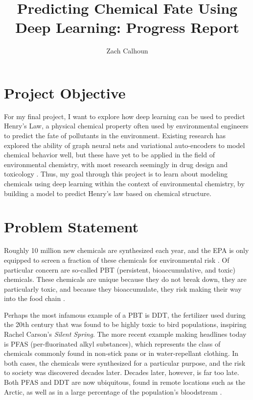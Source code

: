 \documentclass[12pt, oneside]{article}   	%
\title{Predicting Chemical Fate Using Deep Learning: Progress Report}
\author{Zach Calhoun}
\begin{document}
\maketitle
\section{Project Objective}
For my final project, I want to explore how deep learning can be used to predict Henry's Law, a physical chemical property often used by environmental engineers to predict the fate of pollutants in the environment. Existing research has explored the ability of graph neural nets and variational auto-encoders to model chemical behavior well, but these have yet to be applied in the field of environmental chemistry, with most research seemingly in drug design and toxicology \cite{RN106}. Thus, my goal through this project is to learn about modeling chemicals using deep learning within the context of environmental chemistry, by building a model to predict Henry's law based on chemical structure.

\section{Problem Statement}
Roughly 10 million new chemicals are synthesized each year, and the EPA is only equipped to screen a fraction of these chemicals for environmental risk \cite{burton}. Of particular concern are so-called PBT (persistent, bioaccumulative, and toxic) chemicals. These chemicals are unique because they do not break down, they are particularly toxic, and because they bioaccumulate, they risk making their way into the food chain \cite{matthies}.

Perhaps the most infamous example of a PBT is DDT, the fertilizer used during the 20th century that was found to be highly toxic to bird populations, inspiring Rachel Carson's \emph{Silent Spring}. The more recent example making headlines today is PFAS (per-fluorinated alkyl substances), which represents the class of chemicals commonly found in non-stick pans or in water-repellant clothing. In both cases, the chemicals were synthesized for a particular purpose, and the risk to society was discovered decades later. Decades later, however, is far too late. Both PFAS and DDT are now ubiquitous, found in remote locations such as the Arctic, as well as in a large percentage of the population's bloodstream \cite{czub}.
\end{document}
